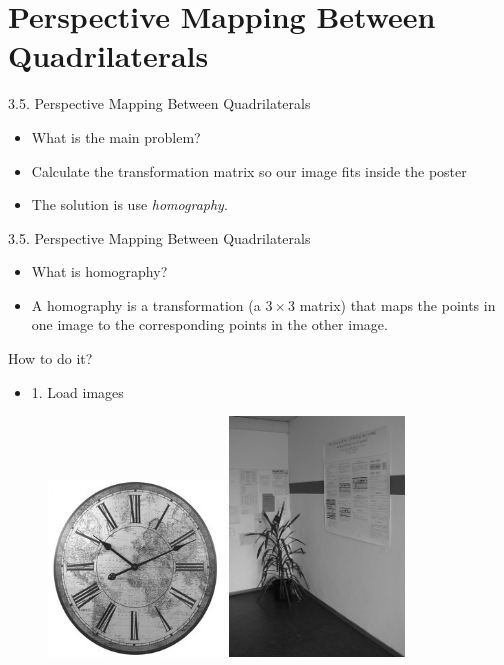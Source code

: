 \documentclass[xcolor={x11names,svgnames,dvipsnames},trans]{beamer}
\begin{document}
\section{Perspective Mapping Between Quadrilaterals}
\begin{frame}{3.5. Perspective Mapping Between Quadrilaterals}
    \begin{itemize}
        \item What is the main problem?
        \item Calculate the transformation matrix so our image fits inside the poster
        \item The solution is use \textit{homography}.
    \end{itemize}
\end{frame}
\begin{frame}{3.5. Perspective Mapping Between Quadrilaterals}
    \begin{itemize}
        \item What is homography?
        \item A homography is a transformation (a $3\times3$ matrix) that maps the points in one image to the corresponding points in the other image.
    \end{itemize}
\end{frame}
\begin{frame}{How to do it?}
    \begin{itemize}
        \item 1. Load images
    \end{itemize}

        \begin{figure}
                \includegraphics[width=4.666cm]{images/clock.jpg}
                \includegraphics[width=4.666cm]{images/isle.jpg}
        \end{figure}

\end{frame}
\end{document}
